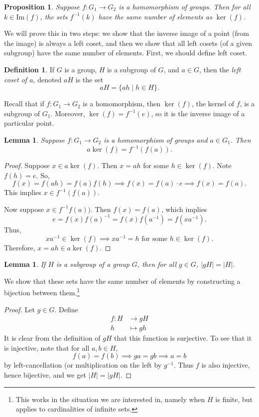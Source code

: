 \documentclass[12pt]{amsart}
\renewcommand{\Im}{\mathrm{Im}} %
\theoremstyle{plain}
\newtheorem{prop}[thm]{Proposition}
\newtheorem{lemma}[thm]{Lemma}
\theoremstyle{definition}
\newtheorem{defn}[thm]{Definition}
\theoremstyle{remark}
\begin{document}
\begin{prop}
  Suppose $f:G_1\to G_2$ is a homomorphism of groups.  Then for all $k\in
  \Im(f)$, the sets $f^{-1}(k)$ have the same number of elements as
  $\ker(f)$.
\end{prop}
We will prove this in two steps: we show that the inverse image of a
point (from the image) is always a left coset, and then we show that
all left cosets (of a given subgroup) have the same number of
elements.  First, we should define left coset.
\begin{defn}
  If $G$ is a group, $H$ is a subgroup of $G$, and $a\in G$, then the
  \emph{left coset of $a$}, denoted $aH$ is the set
  \[ aH=\{ah\mid h\in H\}.\]
\end{defn}
Recall that if $f:G_1\to G_2$ is a homomorphism, then $\ker(f)$, the
kernel of $f$, is a subgroup of $G_1$.  Moreover, $\ker(f) = f^{-1}(e)$,
so it is the inverse image of a particular point.
\begin{lemma}
  Suppose $f:G_1\to G_2$ is a homomorphism of groups and $a\in G_1$.  Then
  \[ a\ker(f) = f^{-1}(f(a)).\]
\end{lemma}
\begin{proof}
  Suppose $x\in a\ker(f)$.  Then $x=ah$ for some $h\in\ker(f)$.  Note
  $f(h) =e$.  So, 
\[ f(x) = f(ah) = f(a)f(h) 
     \implies f(x) = f(a)\cdot e 
     \implies f(x)= f(a). \]
This implies $x\in f^{-1}(f(a))$.  

Now suppose $x\in f^{-1}f(a))$.  Then $f(x)=f(a)$, which implies
\[ e=f(x)f(a)^{-1} = f(x) f(a^{-1}) = f(xa^{-1}).\]
Thus, 
$$xa^{-1}\in \ker(f) \implies xa^{-1} = h \text{ for some $h\in\ker(f)$}.$$
Therefore, $x=ah\in a\ker(f)$.
\end{proof}
\begin{lemma}
  If $H$ is a subgroup of a group $G$, then for all $g\in G$, $|gH| =
  |H|$.
\end{lemma}
  We show that these sets have the same number of elements by 
  constructing a bijection between them.\footnote{This works in the situation
  we are interested in, namely when $H$ is finite, but applies to
  cardinalities of infinite sets.}
\begin{proof}
  Let $g\in G$.  Define
\begin{align*}
  f:H&\to gH \\
  h&\mapsto gh
\end{align*}
It is clear from the definition of $gH$ that this function is surjective.
To see that it is injective, note that for all $a,b\in H$,
\[  f(a) = f(b) \implies ga = gb \implies a=b\]
by left-cancellation (or multiplication on the left by $g^{-1}$.  Thus
$f$ is also injective, hence bijective, and we get $|H|=|gH|$.
\end{proof}
\end{document}

